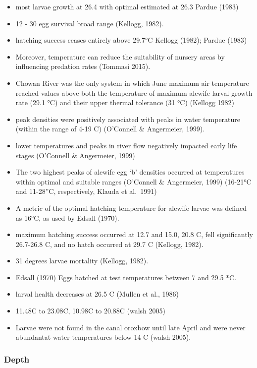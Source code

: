 \documentclass[
]{book}
\begin{document}
\begin{itemize}
\item
  most larvae growth at 26.4 with optimal estimated at 26.3 Pardue (1983)
\item
  12 - 30 egg survival broad range (Kellogg, 1982).
\item
  hatching success ceases entirely above 29.7°C Kellogg (1982); Pardue (1983)
\item
  Moreover, temperature can reduce the suitability of nursery areas by influencing predation rates (Tommasi 2015).
\item
  Chowan River was the only system in which June maximum air temperature reached values above both the temperature of maximum alewife larval growth rate (29.1 °C) and their upper thermal tolerance (31 °C) (Kellogg 1982)
\item
  peak densities were positively associated with peaks in water temperature (within the range of 4-19 C) (O'Connell \& Angermeier, 1999).
\item
  lower temperatures and peaks in river flow negatively impacted early life stages (O'Connell \& Angermeier, 1999)
\item
  The two highest peaks of alewife egg `b' densities occurred at temperatures within optimal and suitable ranges (O'Connell \& Angermeier, 1999) (16-21°C and 11-28''C, respectively, Klauda et al.~1991)
\item
  A metric of the optimal hatching temperature for alewife larvae was defined as 16°C, as used by Edsall (1970).
\item
  maximum hatching success occurred at 12.7 and 15.0, 20.8 C, fell significantly 26.7-26.8 C, and no hatch occurred at 29.7 C (Kellogg, 1982).
\item
  31 degrees larvae mortality (Kellogg, 1982).
\item
  Edsall (1970) Eggs hatched at test temperatures between 7 and 29.5 *C.
\item
  larval health decreases at 26.5 C (Mullen et al., 1986)
\item
  11.48C to 23.08C, 10.98C to 20.88C (walsh 2005)
\item
  Larvae were not found in the canal oroxbow until late April and were never abundantat water temperatures below 14 C (walsh 2005).
\end{itemize}

\hypertarget{depth-2}{%
\subsubsection{Depth}\label{depth-2}}
\end{document}
